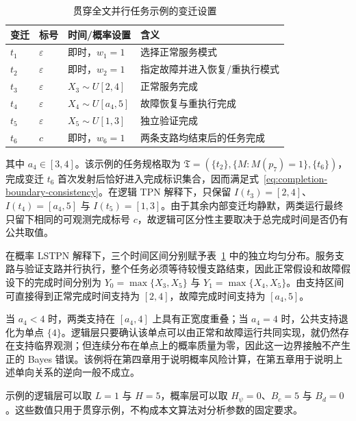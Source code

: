 \documentclass[master,fontset=ubuntu]{shnuthesis}
\theoremstyle{definition}
\begin{document}
\begin{table}[htbp]
\centering
\small
\caption{贯穿全文并行任务示例的变迁设置}
\label{tab:running-example-transitions}
\renewcommand{\arraystretch}{1.18}
\begin{tabularx}{\textwidth}{>{\centering\arraybackslash}p{1.5cm}>{\centering\arraybackslash}p{1.5cm}>{\centering\arraybackslash}p{4.0cm}>{\raggedright\arraybackslash}X}
\hline
变迁 & 标号 & 时间/概率设置 & 含义\\
\hline
\(t_1\) & \(\varepsilon\) & 即时，\(w_1=1\) & 选择正常服务模式\\
\(t_2\) & \(\varepsilon\) & 即时，\(w_2=1\) & 指定故障并进入恢复/重执行模式\\
\(t_3\) & \(\varepsilon\) & \(X_3\sim U[2,4]\) & 正常服务完成\\
\(t_4\) & \(\varepsilon\) & \(X_4\sim U[a_4,5]\) & 故障恢复与重执行完成\\
\(t_5\) & \(\varepsilon\) & \(X_5\sim U[1,3]\) & 独立验证完成\\
\(t_6\) & \(c\) & 即时，\(w_6=1\) & 两条支路均结束后的任务完成\\
\hline
\end{tabularx}
\end{table}

其中 \(a_4\in[3,4]\)。该示例的任务规格取为 \(\mathfrak T=(\{t_2\},\{M:M(p_7)=1\},\{t_6\})\)，完成变迁 \(t_6\) 首次发射后恰好进入完成标识集合，因而满足式~\eqref{eq:completion-boundary-consistency}。在逻辑 TPN 解释下，只保留 \(I(t_3)=[2,4]\)、\(I(t_4)=[a_4,5]\) 与 \(I(t_5)=[1,3]\)。由于其余内部变迁均静默，两类运行最终只留下相同的可观测完成标号 \(c\)，故逻辑可区分性主要取决于总完成时间是否仍有公共取值。

在概率 LSTPN 解释下，三个时间区间分别赋予表~\ref{tab:running-example-transitions} 中的独立均匀分布。服务支路与验证支路并行执行，整个任务必须等待较慢支路结束，因此正常假设和故障假设下的完成时间分别为 \(Y_0=\max\{X_3,X_5\}\) 与 \(Y_1=\max\{X_4,X_5\}\)。由支持区间可直接得到正常完成时间支持为 \([2,4]\)，故障完成时间支持为 \([a_4,5]\)。

当 \(a_4<4\) 时，两类支持在 \([a_4,4]\) 上具有正宽度重叠；当 \(a_4=4\) 时，公共支持退化为单点 \(\{4\}\)。逻辑层只要确认该单点可以由正常和故障运行共同实现，就仍然存在支持临界观测；但连续分布在单点上的概率质量为零，因此这一边界接触不产生正的 Bayes 错误。该例将在第四章用于说明概率风险计算，在第五章用于说明上述单向关系的逆向一般不成立。

示例的逻辑层可以取 \(L=1\) 与 \(H=5\)，概率层可以取 \(H_\psi=0\)、\(B_c=5\) 与 \(B_d=0\)。这些数值只用于贯穿示例，不构成本文算法对分析参数的固定要求。
\end{document}
